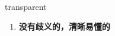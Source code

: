
\begin{frame}
{\huge transparent}
\begin{center}
\begin{enumerate}\Large
  \item \textbf{没有歧义的，清晰易懂的}
\end{enumerate}
\end{center}
\end{frame}
